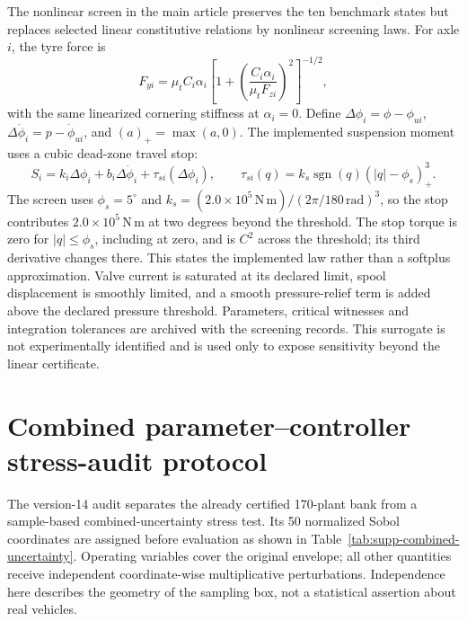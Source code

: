 \documentclass[10pt,a4paper]{article}
\newcommand{\robustnew}[1]{#1}
\begin{document}
The nonlinear screen in the main article preserves the ten benchmark states but replaces selected linear constitutive relations by nonlinear screening laws. For axle $i$, the tyre force is
\begin{equation}
F_{yi}=\mu_t C_i\alpha_i\left[1+\left(\frac{C_i\alpha_i}{\mu_t F_{zi}}\right)^2\right]^{-1/2},
\end{equation}
with the same linearized cornering stiffness at $\alpha_i=0$. Define $\Delta\phi_i=\phi-\phi_{ui}$, $\Delta\dot\phi_i=p-\dot\phi_{ui}$, and $(a)_+=\max(a,0)$. The implemented suspension moment uses a cubic dead-zone travel stop:
\begin{equation}
S_i=k_i\Delta\phi_i+b_i\Delta\dot\phi_i+\tau_{si}(\Delta\phi_i),\qquad
\tau_{si}(q)=k_s\operatorname{sgn}(q)(|q|-\phi_s)_+^3.
\end{equation}
The screen uses $\phi_s=5^\circ$ and $k_s=(2.0\times10^5\,\mathrm{N\,m})/(2\pi/180\,\mathrm{rad})^3$, so the stop contributes $2.0\times10^5\,\mathrm{N\,m}$ at two degrees beyond the threshold. The stop torque is zero for $|q|\le\phi_s$, including at zero, and is $C^2$ across the threshold; its third derivative changes there. This states the implemented law rather than a softplus approximation. Valve current is saturated at its declared limit, spool displacement is smoothly limited, and a smooth pressure-relief term is added above the declared pressure threshold. Parameters, critical witnesses and integration tolerances are archived with the screening records. This surrogate is not experimentally identified and is used only to expose sensitivity beyond the linear certificate.


\section{Combined parameter--controller stress-audit protocol}

\robustnew{The version-14 audit separates the already certified 170-plant bank from a sample-based combined-uncertainty stress test. Its 50 normalized Sobol coordinates are assigned before evaluation as shown in Table~\ref{tab:supp-combined-uncertainty}. Operating variables cover the original envelope; all other quantities receive independent coordinate-wise multiplicative perturbations. Independence here describes the geometry of the sampling box, not a statistical assertion about real vehicles.}
\end{document}
